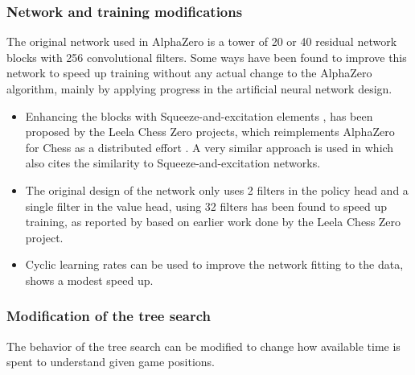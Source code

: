 \documentclass[12pt,onecolumn,oneside,titlepage]{article}
\begin{document}
\subsubsection{Network and training modifications}

The original network used in AlphaZero is a tower of 20 or 40 residual network blocks with 256 convolutional filters. Some ways have been found to improve this network to speed up training without any actual change to the AlphaZero algorithm, mainly by applying progress in the artificial neural network design.

\begin{itemize}
 \item Enhancing the blocks with Squeeze-and-excitation elements \cite{hu2018squeeze}, has been proposed by the Leela Chess Zero projects, which reimplements AlphaZero for Chess as a distributed effort \cite{leela0sq}.
       A very similar approach is used in \cite{wu2019accelerating} which also cites the similarity to Squeeze-and-excitation networks.
 \item The original design of the network only uses 2 filters in the policy head and a single filter in the value head, using 32 filters has been found to speed up training, as reported by \cite{oracledevs6} based on earlier work done by the Leela Chess Zero project.
 \item Cyclic learning rates can be used to improve the network fitting to the data, \cite{oracledevs6} shows a modest speed up.
\end{itemize}

\subsubsection{Modification of the tree search}

The behavior of the tree search can be modified to change how available time is spent to understand given game positions.
\end{document}
